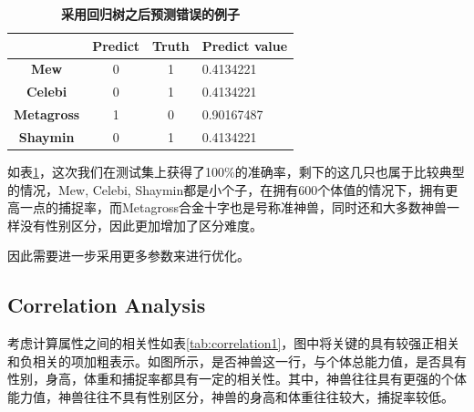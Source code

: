 \documentclass[a4paper, cs4size, oneside]{article}
\begin{document}
\begin{table}[]
\centering
\caption{\textbf{采用回归树之后预测错误的例子}}
\label{tab:result2}
\begin{tabular}{cccl}
\hline
\multicolumn{1}{l}{\textbf{}} & \textbf{Predict} & \textbf{Truth} & Predict value \\ \hline
\textbf{Mew}                  & 0                & 1              & 0.4134221     \\
\textbf{Celebi}               & 0                & 1              & 0.4134221     \\
\textbf{Metagross}            & 1                & 0              & 0.90167487    \\
\textbf{Shaymin}              & 0                & 1              & 0.4134221    
\end{tabular}
\end{table}

如表\ref{tab:result2}，这次我们在测试集上获得了100\%的准确率，剩下的这几只也属于比较典型的情况，Mew, Celebi, Shaymin都是小个子，在拥有600个体值的情况下，拥有更高一点的捕捉率，而Metagross合金十字也是号称准神兽，同时还和大多数神兽一样没有性别区分，因此更加增加了区分难度。

因此需要进一步采用更多参数来进行优化。

\subsection{Correlation Analysis}

考虑计算属性之间的相关性如表\ref{tab:correlation1}，图中将关键的具有较强正相关和负相关的项加粗表示。如图所示，是否神兽这一行，与个体总能力值，是否具有性别，身高，体重和捕捉率都具有一定的相关性。其中，神兽往往具有更强的个体能力值，神兽往往不具有性别区分，神兽的身高和体重往往较大，捕捉率较低。
\end{document}
